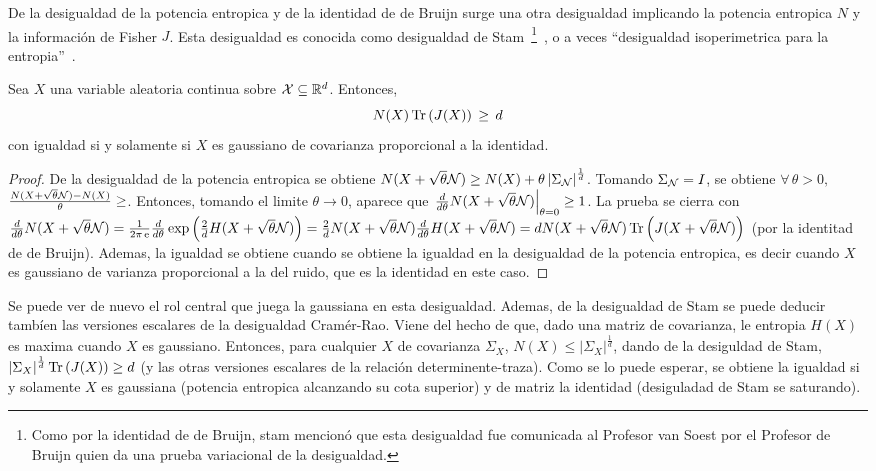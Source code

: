 De la desigualdad de la potencia entropica  y de la identidad de de Bruijn surge
una otra desigualdad implicando la  potencia entropica $N$ y la informaci\'on de
Fisher $J$. Esta desigualdad es conocida como desigualdad de Stam~\footnote{Como
  por  la identidad  de  de Bruijn,  stam  mencion\'o que  esta desigualdad  fue
  comunicada al Profesor van Soest por el Profesor de Bruijn quien da una prueba
  variacional  de  la desigualdad.}~\cite{CovTho06,  Rio07,  Sta59},  o a  veces
``desigualdad isoperimetrica para la entropia''~\cite{WanMad04}.
%
\begin{teorema}
  Sea   $X$    una   variable    aleatoria   continua   sobre    $\mathcal{X}   \subseteq
  \mathbb{R}^d$. Entonces,
  \[
  N(X) \operatorname{Tr}\left( J(X) \right) \, \ge \, d
  \]
  con igualdad si  y solamente si $X$ es gaussiano  de covarianza proporcional a
  la identidad.
\end{teorema}
%
\begin{proof}
  De la  desigualdad de  la potencia entropica  se obtiene $N(X  + \sqrt{\theta}
  \mathcal{N})  \ge N(X)  + \theta  \left| \Sigma_{\mathcal{N}}  \right|^{\frac1d}$. Tomando
  $\Sigma_{\mathcal{N}}  = I$,  se obtiene  $\forall  \, \theta  > 0,$  \ $\frac{N(X  +
    \sqrt{\theta} \mathcal{N})  - N(X)}{\theta} \ge  $.  Entonces, tomando  el limite
  $\theta  \to 0$,  aparece que  $\left. \frac{d}{d\theta}  N(X  + \sqrt{\theta}
    \mathcal{N})   \right|_{\theta  =   0}  \ge   1$.   La   prueba  se   cierra  con
  $\frac{d}{d\theta}  N(X   +  \sqrt{\theta}   \mathcal{N})  =  \frac{1}{2   \pi  \operatorname{e}}
  \frac{d}{d\theta}  \exp\left( \frac2d  H(X +  \sqrt{\theta} \mathcal{N})  \right) =
  \frac2d  N(X +  \sqrt{\theta}  \mathcal{N}) \frac{d}{d\theta}  H(X +  \sqrt{\theta}
  \mathcal{N}) = d N(X +  \sqrt{\theta} \mathcal{N}) \operatorname{Tr}\left( J(X + \sqrt{\theta} \mathcal{N})
  \right)$  (por la identitad  de de  Bruijn).  Ademas,  la igualdad  se obtiene
  cuando se obtiene  la igualdad en la desigualdad de  la potencia entropica, es
  decir cuando $X$ es gaussiano de  varianza proporcional a la del ruido, que es
  la identidad en este caso.
\end{proof}
%
Se  puede  ver  de  nuevo  el  rol  central  que  juega  la  gaussiana  en  esta
desigualdad. Ademas,  de la desigualdad de  Stam se puede  deducir tamb\'ien las
versiones escalares de la desigualdad Cram\'er-Rao. Viene del hecho de que, dado
una matriz de covarianza, le entropia  $H(X)$ es maxima cuando $X$ es gaussiano.
Entonces, para cualquier $X$ de covarianza $\Sigma_X$, $N(X) \le \left| \Sigma_X
\right|^{\frac1d}$,   dando  de   la  desiguldad   de  Stam,   $\left|  \Sigma_X
\right|^{\frac1d} \operatorname{Tr}\left( J(X) \right) \ge d$ (y las otras versiones escalares
de la relaci\'on  determinente-traza).  Como se lo puede  esperar, se obtiene la
igualdad si y solamente $X$  es gaussiana (potencia entropica alcanzando su cota
superior) y de matriz la identidad (desiguladad de Stam se saturando).

